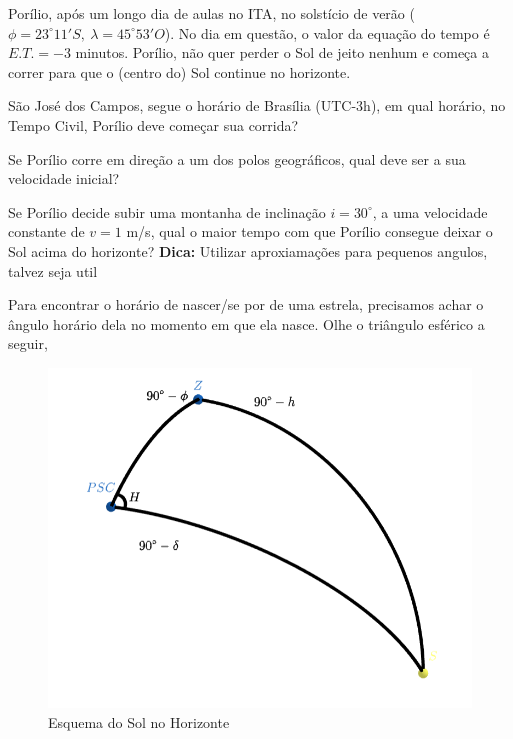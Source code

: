 \documentclass[11pt]{article}
\begin{document}
    
\begin{pproblem}
    Porílio, após um longo dia de aulas no ITA, no solstício de verão (\(\phi =23^\circ 11' S, \ \lambda= 45^\circ53' O\)). No dia em questão, o valor da equação do tempo é \(E.T. = -3\) minutos. Porílio, não quer perder o Sol de jeito nenhum e começa a correr para que o (centro do) Sol continue no horizonte.

    \begin{alternativas}
        \item São José dos Campos, segue o horário de Brasília (UTC-3h), em qual horário, no Tempo Civil, Porílio deve começar sua corrida?
        \item Se Porílio corre em direção a um dos polos geográficos, qual deve ser a sua velocidade inicial?
        \item Se Porílio decide subir uma montanha de inclinação \(i = 30^\circ\), a uma velocidade constante de \(v = 1\) m/s, qual o maior tempo com que Porílio consegue deixar o Sol acima do horizonte?
        \textbf{Dica: } Utilizar aproxiamações para pequenos angulos, talvez seja util
    \end{alternativas}

\begin{pssolution*}{}{}
    \begin{alternativas}
        \item Para encontrar o horário de nascer/se por de uma estrela, precisamos achar o ângulo horário dela no momento em que ela nasce. Olhe o triângulo esférico a seguir, 
        
        \begin{figure}[H]
            \centering
            \includegraphics[width=0.8\linewidth]{imagens/trigangulohorario.png}
            \caption{Esquema do Sol no Horizonte}
        \end{figure}


\end{alternativas}
\end{pssolution*}
\end{pproblem}
\end{document}
